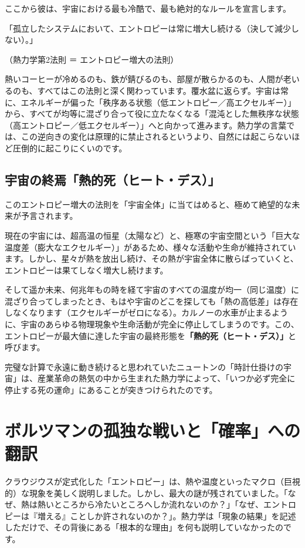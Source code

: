 ここから彼は、宇宙における最も冷酷で、最も絶対的なルールを宣言します。

「孤立したシステムにおいて、エントロピーは常に増大し続ける（決して減少しない）。」

（熱力学第2法則 ＝ エントロピー増大の法則）

熱いコーヒーが冷めるのも、鉄が錆びるのも、部屋が散らかるのも、人間が老いるのも、すべてはこの法則と深く関わっています。覆水盆に返らず。宇宙は常に、エネルギーが偏った「秩序ある状態（低エントロピー／高エクセルギー）」から、すべてが均等に混ざり合って役に立たなくなる「混沌とした無秩序な状態（高エントロピー／低エクセルギー）」へと向かって進みます。熱力学の言葉では、この逆向きの変化は原理的に禁止されるというより、自然には起こらないほど圧倒的に起こりにくいのです。

\subsection{宇宙の終焉「熱的死（ヒート・デス）」}

このエントロピー増大の法則を「宇宙全体」に当てはめると、極めて絶望的な未来が予言されます。

現在の宇宙には、超高温の恒星（太陽など）と、極寒の宇宙空間という「巨大な温度差（膨大なエクセルギー）」があるため、様々な活動や生命が維持されています。しかし、星々が熱を放出し続け、その熱が宇宙全体に散らばっていくと、エントロピーは果てしなく増大し続けます。

そして遥か未来、何兆年もの時を経て宇宙のすべての温度が均一（同じ温度）に混ざり合ってしまったとき、もはや宇宙のどこを探しても「熱の高低差」は存在しなくなります（エクセルギーがゼロになる）。カルノーの水車が止まるように、宇宙のあらゆる物理現象や生命活動が完全に停止してしまうのです。この、エントロピーが最大値に達した宇宙の最終形態を\textbf{「熱的死（ヒート・デス）」}と呼びます。

完璧な計算で永遠に動き続けると思われていたニュートンの「時計仕掛けの宇宙」は、産業革命の熱気の中から生まれた熱力学によって、「いつか必ず完全に停止する死の運命」にあることが突きつけられたのです。

\section{ボルツマンの孤独な戦いと「確率」への翻訳}

クラウジウスが定式化した「エントロピー」は、熱や温度といったマクロ（巨視的）な現象を美しく説明しました。しかし、最大の謎が残されていました。「なぜ、熱は熱いところから冷たいところへしか流れないのか？」「なぜ、エントロピーは『増える』ことしか許されないのか？」。熱力学は「現象の結果」を記述しただけで、その背後にある「根本的な理由」を何も説明していなかったのです。

